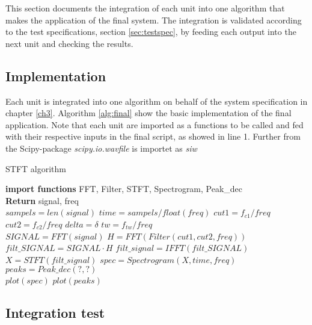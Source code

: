 This section documents the integration of each unit into one algorithm that makes the application of the final system. The integration is validated according to the test specifications, section \ref{sec:testspec}, by feeding each output into the next unit and checking the results. 

\subsection{Implementation}
Each unit is integrated into one algorithm on behalf of the system specification in chapter \ref{ch3}. Algorithm \ref{alg:final} show the basic implementation of the final application. Note that each unit are imported as a functions to be called and fed with their respective inputs in the final script, as showed in line 1. Further from the Scipy-package \textit{scipy.io.wavfile} is importet as \textit{siw} 
\begin{algorithm}[H]
\caption{STFT algorithm}
\label{STFTalg}
\begin{algorithmic}[1]
\State \textbf{import functions} FFT, Filter, STFT, Spectrogram, Peak\_dec  
\\
\State \textbf{Return} signal, freq 
\EndProcedure 
\\
\State $sampels = len(signal)$ 
\State $time   = sampels/float(freq)$
\State $cut1 = f_{c1}/freq$ 
\State $cut2 = f_{c2}/freq$
\State $delta = \delta$
\State $tw = f_{tw}/freq$
\\
\State $SIGNAL = FFT(signal) $
\State $H = FFT(Filter(cut1,cut2,freq))$
\State $filt\_SIGNAL = SIGNAL \cdot H$
\State $filt\_signal = IFFT(filt\_SIGNAL)$  
\EndProcedure 
\\
\State $X = STFT(filt\_signal)$
\State $spec = Spectrogram(X,time,freq)$
\State $peaks = Peak\_dec(?,?)$
\EndProcedure
\\
\State $plot(spec)$ 
\State $plot(peaks)$
\EndProcedure
\end{algorithmic}
\label{alg:final}
\end{algorithm}      

\subsection{Integration test}
